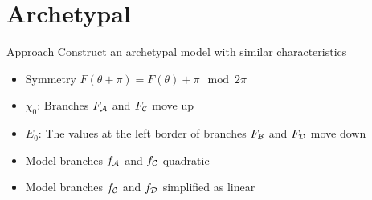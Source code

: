 \section{Archetypal}

\begin{frame}{Approach}
	\vspace{-1em}
	Construct an archetypal model with similar characteristics
	\pause
	\begin{itemize}
		\item Symmetry $F(\theta + \pi) = F(\theta) + \pi \mod 2\pi$ \hfill \cite{akyuz2022} \pause
		\item $\chi_0$: Branches $F_{\mathcal{A}}$ and $F_{\mathcal{C}}$ move up \pause
		\item $E_0$: The values at the left border of branches $F_{\mathcal{B}}$ and $F_{\mathcal{D}}$ move down \pause
		\item Model branches $f_{\mathcal{A}}$ and $f_{\mathcal{C}}$ quadratic \pause
		\item Model branches $f_{\mathcal{C}}$ and $f_{\mathcal{D}}$ simplified as linear
	\end{itemize}

	\begin{figure}
	\end{figure}
\end{frame}

